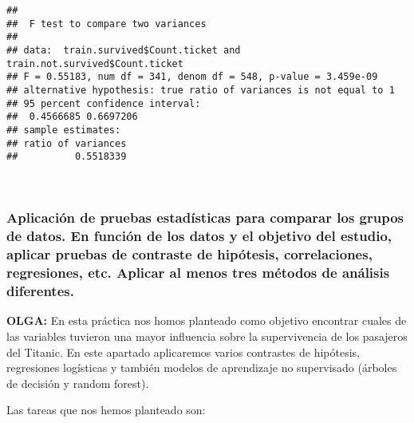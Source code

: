 \documentclass[
]{article}
\newenvironment{Shaded}{\begin{snugshade}}{\end{snugshade}}
\newcommand{\KeywordTok}[1]{\textcolor[rgb]{0.13,0.29,0.53}{\textbf{#1}}}
\newcommand{\NormalTok}[1]{#1}
\newcommand{\OperatorTok}[1]{\textcolor[rgb]{0.81,0.36,0.00}{\textbf{#1}}}
\begin{document}
\begin{Shaded}
\end{Shaded}

\begin{verbatim}
## 
##  F test to compare two variances
## 
## data:  train.survived$Count.ticket and train.not.survived$Count.ticket
## F = 0.55183, num df = 341, denom df = 548, p-value = 3.459e-09
## alternative hypothesis: true ratio of variances is not equal to 1
## 95 percent confidence interval:
##  0.4566685 0.6697206
## sample estimates:
## ratio of variances 
##          0.5518339
\end{verbatim}

\texttt{}~\\
\texttt{}

\hypertarget{aplicaciuxf3n-de-pruebas-estaduxedsticas-para-comparar-los-grupos-de-datos.-en-funciuxf3n-de-los-datos-y-el-objetivo-del-estudio-aplicar-pruebas-de-contraste-de-hipuxf3tesis-correlaciones-regresiones-etc.-aplicar-al-menos-tres-muxe9todos-de-anuxe1lisis-diferentes.}{%
\subsubsection{Aplicación de pruebas estadísticas para comparar los
grupos de datos. En función de los datos y el objetivo del estudio,
aplicar pruebas de contraste de hipótesis, correlaciones, regresiones,
etc. Aplicar al menos tres métodos de análisis
diferentes.}\label{aplicaciuxf3n-de-pruebas-estaduxedsticas-para-comparar-los-grupos-de-datos.-en-funciuxf3n-de-los-datos-y-el-objetivo-del-estudio-aplicar-pruebas-de-contraste-de-hipuxf3tesis-correlaciones-regresiones-etc.-aplicar-al-menos-tres-muxe9todos-de-anuxe1lisis-diferentes.}}

\texttt{}

\textbf{OLGA: } En esta práctica nos homos planteado como objetivo
encontrar cuales de las variables tuvieron una mayor influencia sobre la
supervivencia de los pasajeros del Titanic. En este apartado aplicaremos
varios contrastes de hipótesis, regresiones logísticas y también modelos
de aprendizaje no supervisado (árboles de decisión y random forest).\\
\texttt{}

Las tareas que nos hemos planteado son:
\end{document}
